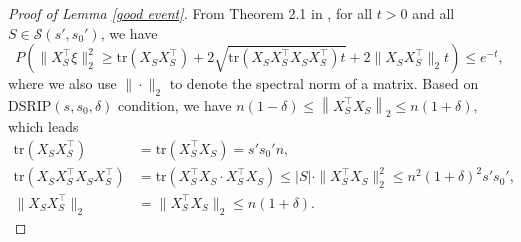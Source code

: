 \documentclass[12pt]{article}
\newtheorem{proof}{Proof}
\begin{document}
\begin{appendix}
\begin{proof}[Proof of Lemma \ref{good event}]
From Theorem 2.1 in \cite{HK12}, for all $t >0$ and all $ S \in \mathcal S(s',s_0')$, we have 
    \begin{equation}\label{eq:Hsu}
        P\left( \|X_S^\top\xi\|_2^2 \ge \text{tr}(X_S X_S^\top)+
     2\sqrt{\text{tr}(X_S X_S^\top X_S X_S^\top)t} + 2 \|X_S X_S^\top \|_2 t \right)
     \le e^{-t},
    \end{equation}
    where we also use $\| \cdot \|_2$ to denote the spectral norm of a matrix.
    Based on DSRIP$(s,s_0, \delta)$ condition, we have $
   n(1-\delta) \le \left\| X_S^\top {X}_{S} \right\|_2 \le n(1+\delta)$,
which leads
\begin{align*}
\text{tr}(X_S X_S^\top) &= \text{tr}(X_S^\top X_S ) =s's_0'n,\\
\text{tr}(X_S X_S^\top X_S X_S^\top) &= \text{tr}(X_S^\top X_S \cdot X_S^\top X_S) \le  |S| \cdot \|X_S^\top X_S \|_2^2 \le n^2 (1+\delta)^2 s's_0', \\
\|X_S X_S^\top \|_2 &=\|X_S^\top X_S \|_2 \le n(1+\delta).
\end{align*}


\end{proof}
\end{appendix}
\end{document}
